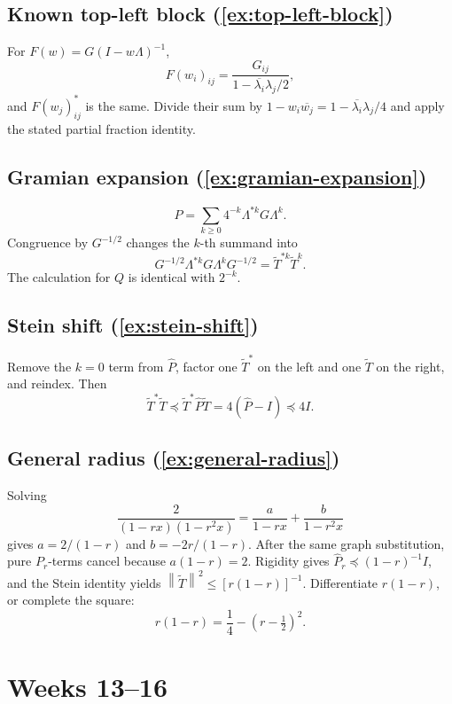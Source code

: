 \documentclass[11pt,oneside,openany]{book}
\theoremstyle{definition}
\theoremstyle{remark}
\newcommand{\norm}[1]{\left\lVert #1\right\rVert}
\begin{document}
\subsection*{Known top-left block (\cref{ex:top-left-block})}

For \(F(w)=G(I-w\Lambda)^{-1}\),
\[
  F(w_i)_{ij}
  =\frac{G_{ij}}{1-\overline{\lambda_i}\lambda_j/2},
\]
and \(F(w_j)^*_{ij}\) is the same.  Divide their sum by
\(
1-w_i\overline{w_j}
=1-\overline{\lambda_i}\lambda_j/4
\)
and apply the stated partial fraction identity.

\subsection*{Gramian expansion (\cref{ex:gramian-expansion})}

\[
  P=\sum_{k\geq0}4^{-k}\Lambda^{*k}G\Lambda^k.
\]
Congruence by \(G^{-1/2}\) changes the \(k\)-th summand into
\[
  G^{-1/2}\Lambda^{*k}G\Lambda^kG^{-1/2}
  =\widetilde T^{*k}\widetilde T^k.
\]
The calculation for \(Q\) is identical with \(2^{-k}\).

\subsection*{Stein shift (\cref{ex:stein-shift})}

Remove the \(k=0\) term from \(\widehat P\), factor one
\(\widetilde T^*\) on the left and one \(\widetilde T\) on the right,
and reindex.  Then
\[
  \widetilde T^*\widetilde T
  \preceq\widetilde T^*\widehat P\widetilde T
  =4(\widehat P-I)\preceq4I.
\]

\subsection*{General radius (\cref{ex:general-radius})}

Solving
\[
  \frac{2}{(1-rx)(1-r^2x)}
  =\frac{a}{1-rx}+\frac{b}{1-r^2x}
\]
gives \(a=2/(1-r)\) and \(b=-2r/(1-r)\).
After the same graph substitution, pure \(P_r\)-terms cancel because
\(a(1-r)=2\).  Rigidity gives
\(\widehat P_r\preceq(1-r)^{-1}I\), and the Stein identity yields
\(
\norm{\widetilde T}^2\leq[r(1-r)]^{-1}
\).
Differentiate \(r(1-r)\), or complete the square:
\[
  r(1-r)=\frac14-(r-\tfrac12)^2.
\]

\section{Weeks 13--16}
\end{document}

